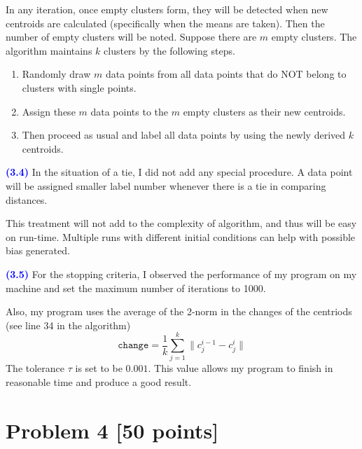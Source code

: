 \documentclass[a4paper,11pt]{article}
\newcommand{\code}[1]{\texttt{#1}}
\newcommand{\qnum}[1]{\noindent\textcolor{blue}{\textbf{(#1)}}}
\begin{document}
In any iteration, once empty clusters form, they will be detected when new centroids are calculated (specifically when the means are taken). 
Then the number of empty clusters will be noted. Suppose there are $m$ empty clusters. The algorithm maintains $k$ clusters by the following steps.
\begin{enumerate}
    \item Randomly draw $m$ data points from all data points that do NOT belong to clusters with single points.
    \item Assign these $m$ data points to the $m$ empty clusters as their new centroids.
    
    \item Then proceed as usual and label all data points by using the newly derived $k$ centroids.
\end{enumerate}
\bigskip


\qnum{3.4}
In the situation of a tie, I did not add any special procedure. 
A data point will be assigned smaller label number whenever there is a tie in comparing distances.

This treatment will not add to the complexity of algorithm, and thus will be easy on run-time. Multiple runs with different initial conditions can help with possible bias generated.
\bigskip


\qnum{3.5}
For the stopping criteria, I observed the performance of my program on my machine and set the maximum number of iterations to 1000. 

Also, my program uses the average of the 2-norm in the changes of the centriods (see line 34 in the algorithm)
\[
  \code{change} = 
  \frac{1}{k}\sum_{j=1}^k\|c_{j}^{i-1} - c_j^i\|
\]
The tolerance $\tau$ is set to be $0.001$. This value allows my program to finish in reasonable time and produce a good result.





























\newpage  
\section*{Problem 4 [50 points]}
 
\end{document}
